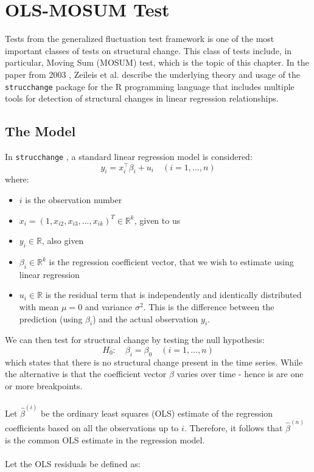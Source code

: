 \documentclass[main.tex]{subfiles}
\begin{document}
\chapter{OLS-MOSUM Test}
\label{chap:mosum}
Tests from the generalized fluctuation test framework \cite{kuan_hornik}
is one of the most important classes of tests on structural change. This class
of tests include, in particular, Moving Sum (MOSUM) test, which is the topic of this chapter.
In the paper from 2003 \cite{strucchange}, Zeileis et al. describe the
underlying theory and usage of the \texttt{strucchange} package for the
R programming language that includes multiple tools for detection of structural
changes in linear regression relationships.

\section{The Model}
\label{sec:model}
In \texttt{strucchange} \cite{strucchange}, a standard linear regression model is considered:
\[
y_{i}=x_{i}^{\top} \beta_{i}+u_{i} \quad(i=1, \ldots, n)
\]
where:
\begin{itemize}
\item $i$ is the observation number
\item $x_i = (1,x_{i2}, x_{i3}, ..., x_{ik})^T \in \mathbb{R}^k$, given to us
\item $y_i \in \mathbb{R}$, also given
\item $\beta_i \in \mathbb{R}^{k} $ is the regression coefficient vector, that
  we wish to estimate using linear regression
\item $u_i \in \mathbb{R}$ is the residual term that is independently and identically
  distributed with mean $\mu = 0$ and variance $\sigma^2$. This is the
  difference between the prediction (using $\beta_i$) and the actual observation $y_i$.
\end{itemize}
We can then test for structural change by testing the null hypothesis:
\[
H_0:\quad \beta_i = \beta_0 \quad(i=1, \ldots, n)
\]
which states that there is no structural change present in the time series.
While the alternative is that the coefficient vector $\beta$ varies over time -
hence is are one or more breakpoints. \\\\
Let $\hat{\beta}^{(i)}$ be the ordinary least squares (OLS) estimate of the
regression coefficients based on all the observations up to $i$.
Therefore, it follows that $\hat{\beta}^{(n)}$ is the common OLS estimate in the regression model. \\\\
Let the OLS residuals be defined as:
\end{document}

